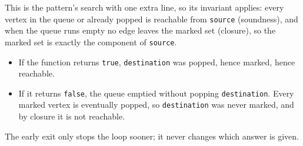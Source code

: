 \begin{invariantbox}
This is the pattern's search with one extra line, so its invariant applies: every vertex in the queue or already popped is reachable from \texttt{source} (soundness), and when the queue runs empty no edge leaves the marked set (closure), so the marked set is exactly the component of \texttt{source}.
\begin{itemize}[leftmargin=*]
    \item If the function returns \texttt{true}, \texttt{destination} was popped, hence marked, hence reachable.
    \item If it returns \texttt{false}, the queue emptied without popping \texttt{destination}. Every marked vertex is eventually popped, so \texttt{destination} was never marked, and by closure it is not reachable.
\end{itemize}
The early exit only stops the loop sooner; it never changes which answer is given.
\end{invariantbox}

